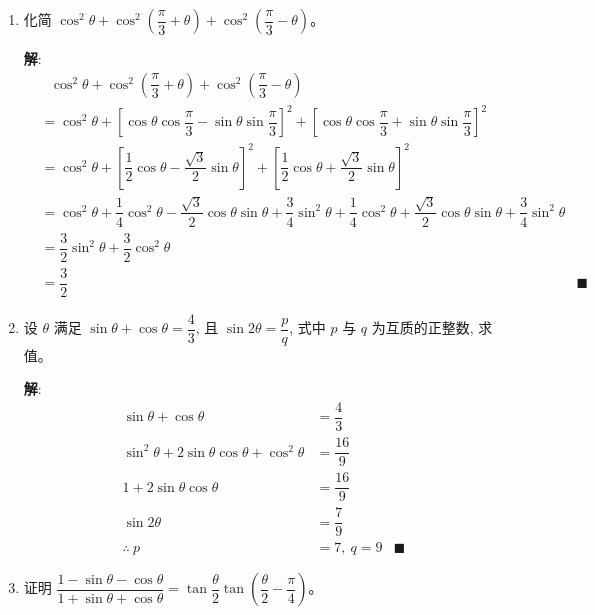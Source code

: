 \documentclass{report}
\newcommand{\sol}{\vspace{0.2cm}\textbf{解}:}
\begin{document}
\begin{enumerate}[leftmargin=*]
        \item 化简 $\cos ^2 \theta+\cos ^2\left(\dfrac{\pi}{3}+\theta\right)+\cos ^2\left(\dfrac{\pi}{3}-\theta\right)$。
        
        \sol{}
        \begin{align*}
            &\ \ \ \cos ^2 \theta+\cos ^2\left(\dfrac{\pi}{3}+\theta\right)+\cos ^2\left(\dfrac{\pi}{3}-\theta\right) \\
            &= \cos ^2 \theta + \left[\cos\theta\cos\dfrac{\pi}{3} - \sin\theta\sin\dfrac{\pi}{3}\right]^2 + \left[\cos\theta\cos\dfrac{\pi}{3} + \sin\theta\sin\dfrac{\pi}{3}\right]^2\\
            &= \cos ^2 \theta + \left[\dfrac{1}{2}\cos\theta - \dfrac{\sqrt{3}}{2}\sin\theta\right]^2 + \left[\dfrac{1}{2}\cos\theta + \dfrac{\sqrt{3}}{2}\sin\theta\right]^2\\
            &= \cos ^2 \theta + \dfrac{1}{4}\cos^2\theta - \dfrac{\sqrt{3}}{2}\cos\theta\sin\theta + \dfrac{3}{4}\sin^2\theta + \dfrac{1}{4}\cos^2\theta + \dfrac{\sqrt{3}}{2}\cos\theta\sin\theta + \dfrac{3}{4}\sin^2\theta\\
            &= \dfrac{3}{2}\sin^2\theta + \dfrac{3}{2}\cos^2\theta\\
            &= \dfrac{3}{2} & \blacksquare
        \end{align*}

        \item 设 $\theta$ 满足 $\sin \theta+\cos \theta=\dfrac{4}{3}$, 且 $\sin 2 \theta=\dfrac{p}{q}$, 式中 $p$ 与 $q$ 为互质的正整数, 求值。
        
        \sol{}
        \begin{align*}
            \sin\theta + \cos\theta &= \dfrac{4}{3}\\
            \sin^2\theta + 2\sin\theta\cos\theta + \cos^2\theta &= \dfrac{16}{9}\\
            1 + 2\sin\theta\cos\theta &= \dfrac{16}{9}\\
            \sin 2\theta &= \dfrac{7}{9}\\
            \therefore\ p &= 7,\ q = 9 & \blacksquare
        \end{align*}

        \newpage
        \item 证明 $\dfrac{1-\sin \theta-\cos \theta}{1+\sin \theta+\cos \theta}=\tan \dfrac{\theta}{2} \tan \left(\dfrac{\theta}{2}-\dfrac{\pi}{4}\right)$。
        

\end{enumerate}
\end{document}
